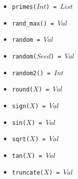 \documentclass[10pt]{article}
\begin{document}
\begin{multicols}{2}
\begin{scriptsize}
\begin{itemize}
   \item \texttt{primes($Int$) = $List$} 
   \item \texttt{rand\_max() = $Val$} 
   \item \texttt{random = $Val$} 
   \item \texttt{random($Seed$) = $Val$} 
   \item \texttt{random2() = $Int$} 
   \item \texttt{round($X$) = $Val$}
   \item \texttt{sign($X$) = $Val$}  
   \item \texttt{sin($X$) = $Val$} 
   \item \texttt{sqrt($X$) = $Val$} 
   \item \texttt{tan($X$) = $Val$}
   \item \texttt{truncate($X$) = $Val$}  

\end{itemize}
\end{scriptsize}
\end{multicols}
\end{document}
